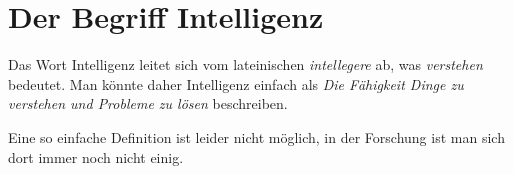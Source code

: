 \chapter{Der Begriff Intelligenz}

Das Wort Intelligenz leitet sich vom lateinischen \emph{intellegere} ab, was
\emph{verstehen} bedeutet. Man könnte daher Intelligenz einfach als
\emph{Die Fähigkeit Dinge zu verstehen und Probleme zu lösen} beschreiben.

Eine so einfache Definition ist leider nicht möglich, in der Forschung ist man
sich dort immer noch nicht einig.
